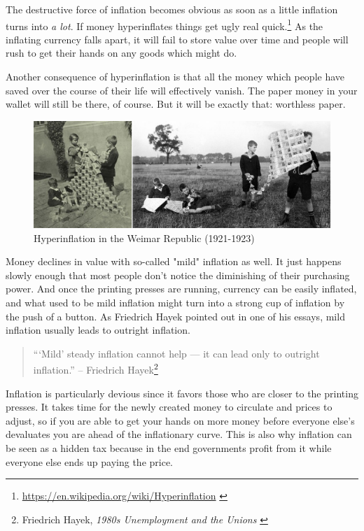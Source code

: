 The destructive force of inflation becomes obvious as soon as a little inflation
turns into \textit{a lot}. If money hyperinflates things get ugly real
quick.\footnote{\url{https://en.wikipedia.org/wiki/Hyperinflation}
\cite{wiki:hyperinflation}} As the inflating currency falls apart, it will fail
to store value over time and people will rush to get their hands on any goods
which might do.

Another consequence of hyperinflation is that all the money which people
have saved over the course of their life will effectively vanish. The
paper money in your wallet will still be there, of course. But it will
be exactly that: worthless paper.

\begin{figure}
  \includegraphics{assets/images/children-playing-with-money.png}
  \caption{Hyperinflation in the Weimar Republic (1921-1923)}
  \label{fig:children-playing-with-money}
\end{figure}

Money declines in value with so-called "mild" inflation as well. It
just happens slowly enough that most people don't notice the diminishing
of their purchasing power. And once the printing presses are running,
currency can be easily inflated, and what used to be mild inflation
might turn into a strong cup of inflation by the push of a button. As
Friedrich Hayek pointed out in one of his essays, mild inflation usually
leads to outright inflation.

\begin{quotation}
```Mild' steady inflation cannot help --- it can lead only to outright
inflation.''
\flushright -- Friedrich Hayek\footnote{Friedrich Hayek, \textit{1980s
Unemployment and the Unions} \cite{hayek-inflation}}
\end{quotation}

Inflation is particularly devious since it favors those who are closer
to the printing presses. It takes time for the newly created money to
circulate and prices to adjust, so if you are able to get your hands on
more money before everyone else's devaluates you are ahead of the
inflationary curve. This is also why inflation can be seen as a hidden
tax because in the end governments profit from it while everyone else
ends up paying the price.

